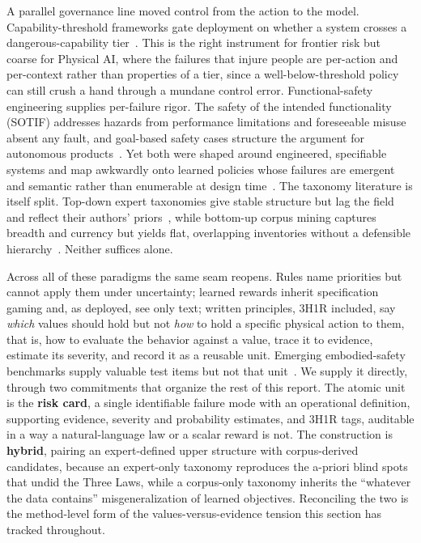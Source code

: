 \documentclass[11pt]{article}
\begin{document}
A parallel governance line moved control from the action to the model. Capability-threshold frameworks gate deployment on whether a system crosses a dangerous-capability tier~\cite{openai2025prep,anthropic2024rsp,deepmind2025fsf}. This is the right instrument for frontier risk but coarse for Physical AI, where the failures that injure people are per-action and per-context rather than properties of a tier, since a well-below-threshold policy can still crush a hand through a mundane control error. Functional-safety engineering supplies per-failure rigor. The safety of the intended functionality (SOTIF) addresses hazards from performance limitations and foreseeable misuse absent any fault, and goal-based safety cases structure the argument for autonomous products~\cite{iso21448,ul4600}. Yet both were shaped around engineered, specifiable systems and map awkwardly onto learned policies whose failures are emergent and semantic rather than enumerable at design time~\cite{achiam2017}. The taxonomy literature is itself split. Top-down expert taxonomies give stable structure but lag the field and reflect their authors' priors~\cite{weidinger2021,hendrycks2023}, while bottom-up corpus mining captures breadth and currency but yields flat, overlapping inventories without a defensible hierarchy~\cite{slattery2024}. Neither suffices alone.

Across all of these paradigms the same seam reopens. Rules name priorities but cannot apply them under uncertainty; learned rewards inherit specification gaming and, as deployed, see only text; written principles, 3H1R included, say \emph{which} values should hold but not \emph{how} to hold a specific physical action to them, that is, how to evaluate the behavior against a value, trace it to evidence, estimate its severity, and record it as a reusable unit. Emerging embodied-safety benchmarks supply valuable test items but not that unit~\cite{sermanet-asimov,asimov2}. We supply it directly, through two commitments that organize the rest of this report. The atomic unit is the \textbf{risk card}, a single identifiable failure mode with an operational definition, supporting evidence, severity and probability estimates, and 3H1R tags, auditable in a way a natural-language law or a scalar reward is not. The construction is \textbf{hybrid}, pairing an expert-defined upper structure with corpus-derived candidates, because an expert-only taxonomy reproduces the a-priori blind spots that undid the Three Laws, while a corpus-only taxonomy inherits the ``whatever the data contains'' misgeneralization of learned objectives. Reconciling the two is the method-level form of the values-versus-evidence tension this section has tracked throughout.
\end{document}
